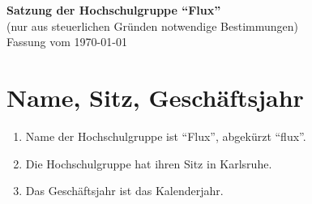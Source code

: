 \documentclass[11pt]{article}
\begin{document}
	\begin{center}
		\Large
		\textbf{
			Satzung der Hochschulgruppe ``Flux''}\\
		\normalsize
		(nur aus steuerlichen Gründen notwendige Bestimmungen)\\
		\vspace{10mm}
		Fassung vom \today
		\vspace{10mm}
	\end{center}

	\section{Name, Sitz, Geschäftsjahr}
	\begin{enumerate}
		\item Name der Hochschulgruppe ist ``Flux'', abgekürzt ``flux''.
		\item Die Hochschulgruppe hat ihren Sitz in Karlsruhe.
		\item Das Geschäftsjahr ist das Kalenderjahr.
	\end{enumerate}
\end{document}
